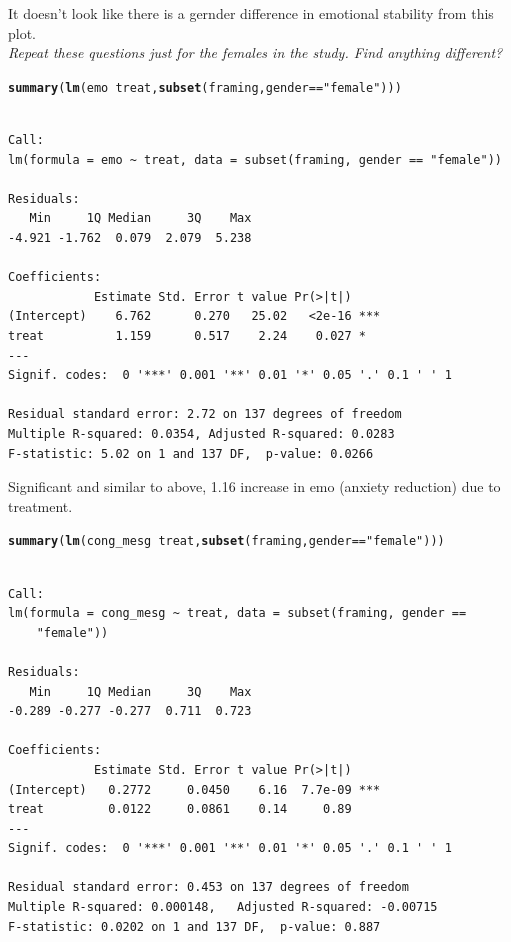 \documentclass{article}\usepackage{graphicx, color}
\makeatletter
\newcommand{\hlfunctioncall}[1]{\textcolor[rgb]{0.501960784313725,0,0.329411764705882}{\textbf{#1}}}%
\newcommand{\hlstring}[1]{\textcolor[rgb]{0.6,0.6,1}{#1}}%
\newenvironment{kframe}{%
 \def\at@end@of@kframe{}%
 \ifinner\ifhmode%
  \def\at@end@of@kframe{\end{minipage}}%
  \begin{minipage}{\columnwidth}%
 \fi\fi%
 \def\FrameCommand##1{\hskip\@totalleftmargin \hskip-\fboxsep
 \colorbox{shadecolor}{##1}\hskip-\fboxsep
     \hskip-\linewidth \hskip-\@totalleftmargin \hskip\columnwidth}%
 \MakeFramed {\advance\hsize-\width
   \@totalleftmargin\z@ \linewidth\hsize
   \@setminipage}}%
 {\par\unskip\endMakeFramed%
 \at@end@of@kframe}
\newenvironment{knitrout}{}{} %
\makeatother
\begin{document}
It doesn't look like there is a gernder difference in emotional stability from this plot.\\

\emph{Repeat these questions just for the females in the study. Find anything different?}
\begin{knitrout}
\color{fgcolor}\begin{kframe}
\begin{alltt}
\hlfunctioncall{summary}(\hlfunctioncall{lm}(emo ~ treat,\hlfunctioncall{subset}(framing,gender==\hlstring{"female"}))) 
\end{alltt}
\begin{verbatim}

Call:
lm(formula = emo ~ treat, data = subset(framing, gender == "female"))

Residuals:
   Min     1Q Median     3Q    Max 
-4.921 -1.762  0.079  2.079  5.238 

Coefficients:
            Estimate Std. Error t value Pr(>|t|)    
(Intercept)    6.762      0.270   25.02   <2e-16 ***
treat          1.159      0.517    2.24    0.027 *  
---
Signif. codes:  0 '***' 0.001 '**' 0.01 '*' 0.05 '.' 0.1 ' ' 1 

Residual standard error: 2.72 on 137 degrees of freedom
Multiple R-squared: 0.0354,	Adjusted R-squared: 0.0283 
F-statistic: 5.02 on 1 and 137 DF,  p-value: 0.0266 
\end{verbatim}
\end{kframe}
\end{knitrout}

Significant and similar to above, 1.16 increase in emo (anxiety reduction) due to treatment.
\begin{knitrout}
\color{fgcolor}\begin{kframe}
\begin{alltt}
\hlfunctioncall{summary}(\hlfunctioncall{lm}(cong_mesg ~ treat,\hlfunctioncall{subset}(framing,gender==\hlstring{"female"}))) 
\end{alltt}
\begin{verbatim}

Call:
lm(formula = cong_mesg ~ treat, data = subset(framing, gender == 
    "female"))

Residuals:
   Min     1Q Median     3Q    Max 
-0.289 -0.277 -0.277  0.711  0.723 

Coefficients:
            Estimate Std. Error t value Pr(>|t|)    
(Intercept)   0.2772     0.0450    6.16  7.7e-09 ***
treat         0.0122     0.0861    0.14     0.89    
---
Signif. codes:  0 '***' 0.001 '**' 0.01 '*' 0.05 '.' 0.1 ' ' 1 

Residual standard error: 0.453 on 137 degrees of freedom
Multiple R-squared: 0.000148,	Adjusted R-squared: -0.00715 
F-statistic: 0.0202 on 1 and 137 DF,  p-value: 0.887 
\end{verbatim}
\end{kframe}
\end{knitrout}
\end{document}
